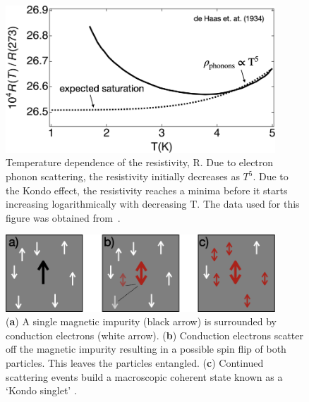 \begin{figure}[!hbt]
 \begin{center}
  \includegraphics[width=0.9\textwidth]{figures/ch2/crop_FiguresMaster.008.png}
  \caption[Kondo effect in bulk materials]{\label{fig:ch2/kondo_bulkmetal} 
  Temperature dependence of the resistivity, $\mathrm{R}$. Due to electron phonon scattering, the resistivity initially decreases as $T^5$. Due to the Kondo effect, the resistivity reaches a minima before it starts increasing logarithmically with decreasing $\mathrm{T}$. The data used for this figure was obtained from~\cite{de_haas}.
   }
 \end{center}
\end{figure}


\begin{figure}[!hbt]
 \begin{center}
  \includegraphics[width=0.9\textwidth]{figures/ch2/crop_FiguresMaster.009.png}
  \caption[Kondo effect illustration]{\label{fig:ch2/kondo_bulkdiagram} 
  (\textbf{a}) A single magnetic impurity (black arrow) is surrounded by conduction electrons (white arrow). (\textbf{b}) Conduction electrons scatter off the magnetic impurity resulting in a possible spin flip of both particles. This leaves the particles entangled. (\textbf{c}) Continued scattering events build a macroscopic coherent state known as a `Kondo singlet' .
   }
 \end{center}
\end{figure}


